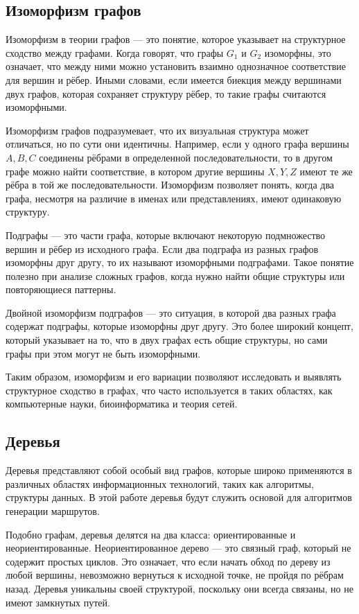 \subsection{Изоморфизм графов}


Изоморфизм в теории графов — это понятие, которое указывает на структурное сходство между графами. Когда говорят, что графы $G_1$ и $G_2$ изоморфны, это означает, что между ними можно установить взаимно однозначное соответствие для вершин и рёбер. Иными словами, если имеется биекция между вершинами двух графов, которая сохраняет структуру рёбер, то такие графы считаются изоморфными.

Изоморфизм графов подразумевает, что их визуальная структура может отличаться, но по сути они идентичны. Например, если у одного графа вершины $A, B, C$ соединены рёбрами в определенной последовательности, то в другом графе можно найти соответствие, в котором другие вершины $X, Y, Z$ имеют те же рёбра в той же последовательности. Изоморфизм позволяет понять, когда два графа, несмотря на различие в именах или представлениях, имеют одинаковую структуру.

Подграфы — это части графа, которые включают некоторую подмножество вершин и рёбер из исходного графа. Если два подграфа из разных графов изоморфны друг другу, то их называют изоморфными подграфами. Такое понятие полезно при анализе сложных графов, когда нужно найти общие структуры или повторяющиеся паттерны.

Двойной изоморфизм подграфов — это ситуация, в которой два разных графа содержат подграфы, которые изоморфны друг другу. Это более широкий концепт, который указывает на то, что в двух графах есть общие структуры, но сами графы при этом могут не быть изоморфными.

Таким образом, изоморфизм и его вариации позволяют исследовать и выявлять структурное сходство в графах, что часто используется в таких областях, как компьютерные науки, биоинформатика и теория сетей.


\subsection{Деревья}

Деревья представляют собой особый вид графов, которые широко применяются в различных областях информационных технологий, таких как алгоритмы, структуры данных. В этой работе деревья будут служить основой для алгоритмов генерации маршрутов.

Подобно графам, деревья делятся на два класса: ориентированные и неориентированные. Неориентированное дерево — это связный граф, который не содержит простых циклов. Это означает, что если начать обход по дереву из любой вершины, невозможно вернуться к исходной точке, не пройдя по рёбрам назад. Деревья уникальны своей структурой, поскольку они всегда связаны, но не имеют замкнутых путей.

